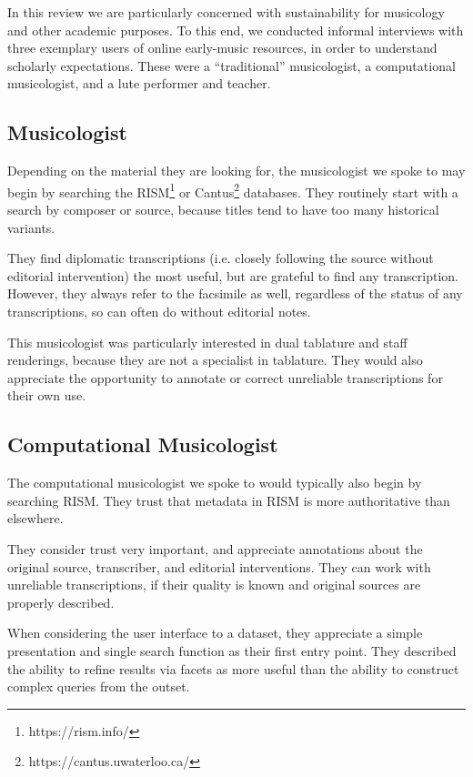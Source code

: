 \documentclass[sigconf, nonacm=true]{acmart}
\begin{document}
\begin{sloppypar}
  In this review we are particularly concerned with sustainability for
  musicology and other academic purposes. To this end, we conducted
  informal interviews with three exemplary users of online early-music
  resources, in order to understand scholarly expectations. These were
  a ``traditional'' musicologist, a computational musicologist, and a
  lute performer and teacher.
  
  \subsection{Musicologist}

  Depending on the material they are looking for, the musicologist we
  spoke to may begin by searching the
  RISM\footnote{https://rism.info/} or
  Cantus\footnote{https://cantus.uwaterloo.ca/} databases. They
  routinely start with a search by composer or source, because titles
  tend to have too many historical variants.

  They find diplomatic transcriptions (i.e. closely following the
  source without editorial intervention) the most useful, but are
  grateful to find any transcription. However, they always refer to
  the facsimile as well, regardless of the status of any
  transcriptions, so can often do without editorial notes.
  
  This musicologist was particularly interested in dual tablature and
  staff renderings, because they are not a specialist in
  tablature. They would also appreciate the opportunity to annotate or
  correct unreliable transcriptions for their own use.
  
  \subsection{Computational Musicologist}

  The computational musicologist we spoke to would typically also
  begin by searching RISM. They trust that metadata in RISM is more
  authoritative than elsewhere.
  
  They consider trust very important, and appreciate annotations about
  the original source, transcriber, and editorial interventions. They
  can work with unreliable transcriptions, if their quality is known
  and original sources are properly described.
  
  When considering the user interface to a dataset, they appreciate a
  simple presentation and single search function as their first entry
  point. They described the ability to refine results via facets as
  more useful than the ability to construct complex queries from the
  outset.
  

\end{sloppypar}
\end{document}
